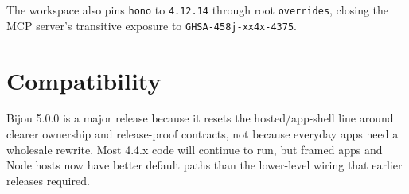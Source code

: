 The workspace also pins \texttt{h\allowbreak{}o\allowbreak{}n\allowbreak{}o} to \texttt{4\allowbreak{}.\allowbreak{}1\allowbreak{}2\allowbreak{}.\allowbreak{}1\allowbreak{}4} through root \texttt{o\allowbreak{}v\allowbreak{}e\allowbreak{}r\allowbreak{}r\allowbreak{}i\allowbreak{}d\allowbreak{}e\allowbreak{}s}, closing the MCP server's transitive exposure to \texttt{G\allowbreak{}H\allowbreak{}S\allowbreak{}A\allowbreak{}-\allowbreak{}4\allowbreak{}5\allowbreak{}8\allowbreak{}j\allowbreak{}-\allowbreak{}x\allowbreak{}x\allowbreak{}4\allowbreak{}x\allowbreak{}-\allowbreak{}4\allowbreak{}3\allowbreak{}7\allowbreak{}5}.

\section{Compatibility}\label{record-280-compatibility}

Bijou 5.0.0 is a major release because it resets the hosted/app-shell line around clearer ownership and release-proof contracts, not because everyday apps need a wholesale rewrite. Most 4.4.x code will continue to run, but framed apps and Node hosts now have better default paths than the lower-level wiring that earlier releases required.

